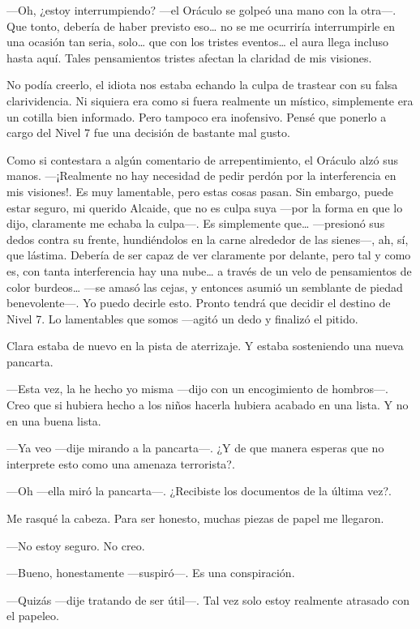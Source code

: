 ---Oh, ¿estoy interrumpiendo? ---el Oráculo se golpeó una mano con la
otra---. Que tonto, debería de haber previsto eso\ldots{} no se me
ocurriría interrumpirle en una ocasión tan seria, solo\ldots{} que con
los tristes eventos\ldots{} el aura llega incluso hasta aquí. Tales
pensamientos tristes afectan la claridad de mis visiones.

No podía creerlo, el idiota nos estaba echando la culpa de trastear con
su falsa clarividencia. Ni siquiera era como si fuera realmente un
místico, simplemente era un cotilla bien informado. Pero tampoco era
inofensivo. Pensé que ponerlo a cargo del Nivel 7 fue una decisión de
bastante mal gusto.

Como si contestara a algún comentario de arrepentimiento, el Oráculo
alzó sus manos. ---¡Realmente no hay necesidad de pedir perdón por la
interferencia en mis visiones!. Es muy lamentable, pero estas cosas
pasan. Sin embargo, puede estar seguro, mi querido Alcaide, que no es
culpa suya ---por la forma en que lo dijo, claramente me echaba la
culpa---. Es simplemente que\ldots{} ---presionó sus dedos contra su
frente, hundiéndolos en la carne alrededor de las sienes---, ah, sí, que
lástima. Debería de ser capaz de ver claramente por delante, pero tal y
como es, con tanta interferencia hay una nube\ldots{} a través de un
velo de pensamientos de color burdeos\ldots{} ---se amasó las cejas, y
entonces asumió un semblante de piedad benevolente---. Yo puedo decirle
esto. Pronto tendrá que decidir el destino de Nivel 7. Lo lamentables
que somos ---agitó un dedo y finalizó el pitido.

Clara estaba de nuevo en la pista de aterrizaje. Y estaba sosteniendo
una nueva pancarta.

---Esta vez, la he hecho yo misma ---dijo con un encogimiento de
hombros---. Creo que si hubiera hecho a los niños hacerla hubiera
acabado en una lista. Y no en una buena lista.

---Ya veo ---dije mirando a la pancarta---. ¿Y de que manera esperas que
no interprete esto como una amenaza terrorista?.

---Oh ---ella miró la pancarta---. ¿Recibiste los documentos de la
última vez?.

Me rasqué la cabeza. Para ser honesto, muchas piezas de papel me
llegaron.

---No estoy seguro. No creo.

---Bueno, honestamente ---suspiró---. Es una conspiración.

---Quizás ---dije tratando de ser útil---. Tal vez solo estoy realmente
atrasado con el papeleo.

